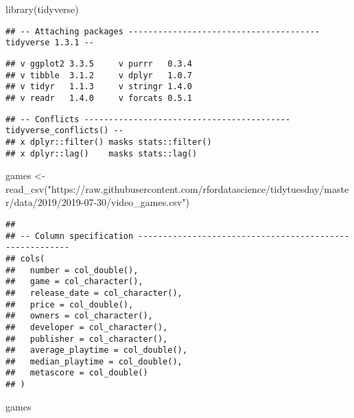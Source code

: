 \documentclass[
]{article}
\author{}
\date{\vspace{-2.5em}}
\newenvironment{Shaded}{\begin{snugshade}}{\end{snugshade}}
\newcommand{\FunctionTok}[1]{\textcolor[rgb]{0.00,0.00,0.00}{#1}}
\newcommand{\NormalTok}[1]{#1}
\newcommand{\OtherTok}[1]{\textcolor[rgb]{0.56,0.35,0.01}{#1}}
\newcommand{\StringTok}[1]{\textcolor[rgb]{0.31,0.60,0.02}{#1}}
\begin{document}
\begin{Shaded}
\begin{Highlighting}[]
\FunctionTok{library}\NormalTok{(tidyverse)}
\end{Highlighting}
\end{Shaded}

\begin{verbatim}
## -- Attaching packages --------------------------------------- tidyverse 1.3.1 --
\end{verbatim}

\begin{verbatim}
## v ggplot2 3.3.5     v purrr   0.3.4
## v tibble  3.1.2     v dplyr   1.0.7
## v tidyr   1.1.3     v stringr 1.4.0
## v readr   1.4.0     v forcats 0.5.1
\end{verbatim}

\begin{verbatim}
## -- Conflicts ------------------------------------------ tidyverse_conflicts() --
## x dplyr::filter() masks stats::filter()
## x dplyr::lag()    masks stats::lag()
\end{verbatim}

\begin{Shaded}
\begin{Highlighting}[]
\NormalTok{games }\OtherTok{\textless{}{-}} \FunctionTok{read\_csv}\NormalTok{(}\StringTok{"https://raw.githubusercontent.com/rfordatascience/tidytuesday/master/data/2019/2019{-}07{-}30/video\_games.csv"}\NormalTok{)}
\end{Highlighting}
\end{Shaded}

\begin{verbatim}
## 
## -- Column specification --------------------------------------------------------
## cols(
##   number = col_double(),
##   game = col_character(),
##   release_date = col_character(),
##   price = col_double(),
##   owners = col_character(),
##   developer = col_character(),
##   publisher = col_character(),
##   average_playtime = col_double(),
##   median_playtime = col_double(),
##   metascore = col_double()
## )
\end{verbatim}

\begin{Shaded}
\begin{Highlighting}[]
\NormalTok{games}
\end{Highlighting}
\end{Shaded}
\end{document}
